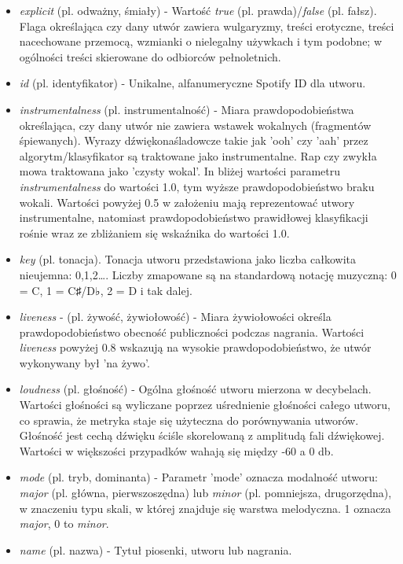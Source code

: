 \documentclass[a4paper,11pt]{article}
\begin{document}
\begin{itemize}
        \item \textit{explicit} (pl. odważny, śmiały) - Wartość \textit{true} (pl. prawda)/\textit{false} (pl. fałsz). Flaga określająca czy dany utwór zawiera wulgaryzmy, treści erotyczne, treści nacechowane przemocą, wzmianki o nielegalny używkach i tym podobne; w ogólności treści skierowane do odbiorców pełnoletnich.
        \item \textit{id} (pl. identyfikator) - Unikalne, alfanumeryczne Spotify ID dla utworu.
        \item \textit{instrumentalness} (pl. instrumentalność) - Miara prawdopodobieństwa określająca, czy dany utwór nie zawiera wstawek wokalnych (fragmentów śpiewanych). Wyrazy dźwiękonaśladowcze takie jak 'ooh' czy 'aah' przez algorytm/klasyfikator są traktowane jako instrumentalne. Rap czy zwykła mowa traktowana jako 'czysty wokal'. In bliżej wartości parametru \textit{instrumentalness} do wartości 1.0, tym wyższe prawdopodobieństwo braku wokali. Wartości powyżej 0.5 w założeniu mają reprezentować utwory instrumentalne, natomiast prawdopodobieństwo prawidłowej klasyfikacji rośnie wraz ze zbliżaniem się wskaźnika do wartości 1.0.
        \item \textit{key} (pl. tonacja). Tonacja utworu przedstawiona jako liczba całkowita nieujemna: 0,1,2\ldots . Liczby zmapowane są na standardową notację muzyczną: 0 = C, 1 = C♯/D♭, 2 = D i tak dalej.
        \item \textit{liveness} - (pl. żywość, żywiołowość) - Miara żywiołowości określa prawdopodobieństwo obecność publiczności podczas nagrania. Wartości \textit{liveness} powyżej 0.8 wskazują na wysokie prawdopodobieństwo, że utwór wykonywany był 'na żywo'.
        \item \textit{loudness} (pl. głośność) - Ogólna głośność utworu mierzona w decybelach. Wartości głośności są wyliczane poprzez uśrednienie głośności całego utworu, co sprawia, że metryka staje się użyteczna do porównywania utworów. Głośność jest cechą dźwięku ściśle skorelowaną z amplitudą fali dźwiękowej. Wartości w większości przypadków wahają się między -60 a 0 db.
        \item \textit{mode} (pl. tryb, dominanta) - Parametr 'mode' oznacza modalność utworu: \textit{major} (pl. główna, pierwszoszędna) lub \textit{minor} (pl. pomniejsza, drugorzędna), w znaczeniu typu skali, w której znajduje się warstwa melodyczna. 1 oznacza \textit{major}, 0 to \textit{minor}.
        \item \textit{name} (pl. nazwa) - Tytuł piosenki, utworu lub nagrania.

\end{itemize}
\end{document}
